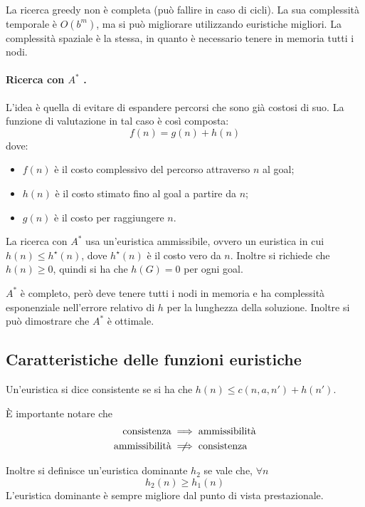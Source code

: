 \documentclass[a4paper, 11pt]{article}
\newcommand{\astar}{$A^\ast$ }
\begin{document}
La ricerca greedy non è completa (può fallire in caso di cicli). La sua complessità temporale è $O(b^m)$, ma si può migliorare utilizzando euristiche migliori. La complessità spaziale è la stessa, in quanto è necessario tenere in memoria tutti i nodi.

\paragraph{Ricerca con \astar.} L'idea è quella di evitare di espandere percorsi che sono già costosi di suo. La funzione di valutazione in tal caso è così composta: \[ f(n) = g(n) + h(n) \] dove: \begin{itemize}
	\item $f(n)$ è il costo complessivo del percorso attraverso $n$ al goal;
	\item $h(n)$ è il costo stimato fino al goal a partire da $n$;
	\item $g(n)$ è il costo per raggiungere $n$.
\end{itemize}

La ricerca con \astar usa un'euristica ammissibile, ovvero un euristica in cui $h(n) \leq h^\star(n)$, dove $h^\star(n)$ è il costo vero da $n$. Inoltre si richiede che $h(n) \geq 0$, quindi si ha che $h(G) = 0$ per ogni goal.

\astar è completo, però deve tenere tutti i nodi in memoria e ha complessità esponenziale nell'errore relativo di $h$ per la lunghezza della soluzione. Inoltre si può dimostrare che \astar è ottimale.

\subsection{Caratteristiche delle funzioni euristiche}
Un'euristica si dice consistente se si ha che $h(n) \leq c(n,a,n') + h(n')$.
\begin{wrapfigure}{R}{0.3\textwidth}
\end{wrapfigure}

È importante notare che 
\begin{align*} 
	\text{consistenza} &\implies \text{ammissibilità} \\ 
	\text{ammissibilità} &\centernot\implies \text{consistenza}  
\end{align*}

Inoltre si definisce un'euristica dominante $h_2$ se vale che, $\forall n$ \[ h_2(n) \geq h_1(n) \]
L'euristica dominante è sempre migliore dal punto di vista prestazionale.
\end{document}
